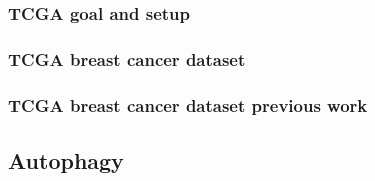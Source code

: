         \subsubsection{TCGA goal and setup}
        \subsubsection{TCGA breast cancer dataset}

        \subsubsection{TCGA breast cancer dataset previous work}
        
        
        
        
    \subsection{Autophagy}
    
